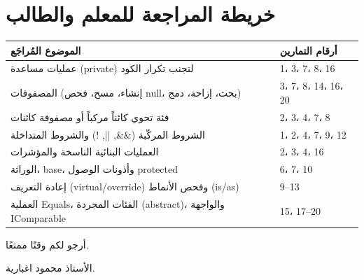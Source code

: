 \documentclass[14pt]{extarticle}
\begin{document}
\section*{خريطة المراجعة للمعلم والطالب}
\begin{center}
\renewcommand{\arraystretch}{1.35}
{\small
\begin{tabular}{|p{}|p{}|}
\hline
\textbf{الموضوع المُراجَع} & \textbf{أرقام التمارين} \\
\hline
عمليات مساعدة (\textenglish{private}) لتجنب تكرار الكود & 1، 3، 7، 8، 16 \\
\hline
المصفوفات (إنشاء، مسح، فحص \textenglish{null}، بحث، إزاحة، دمج) & 3، 7، 8، 14، 16، 20 \\
\hline
فئة تحوي كائناً مركباً أو مصفوفة كائنات & 2، 3، 4، 7، 8 \\
\hline
الشروط المركّبة (\textenglish{\&\&}, \textenglish{||}, \textenglish{!}) والشروط المتداخلة & 1، 2، 4، 7، 9، 12 \\
\hline
العمليات البنائية الناسخة والمؤشرات & 2، 3، 4، 16 \\
\hline
الوراثة، \textenglish{base}، وأذونات الوصول \textenglish{protected} & 6، 7، 10 \\
\hline
إعادة التعريف (\textenglish{virtual}/\textenglish{override}) وفحص الأنماط (\textenglish{is}/\textenglish{as}) & 9–13 \\
\hline
العملية \textenglish{Equals}، الفئات المجردة (\textenglish{abstract})، والواجهة \textenglish{IComparable} & 15، 17–20 \\
\hline
\end{tabular}
}
\end{center}

\vspace{1cm}
\begin{flushleft}
أرجو لكم وقتًا ممتعًا.

الأستاذ محمود اغبارية.
\end{flushleft}
\end{document}
